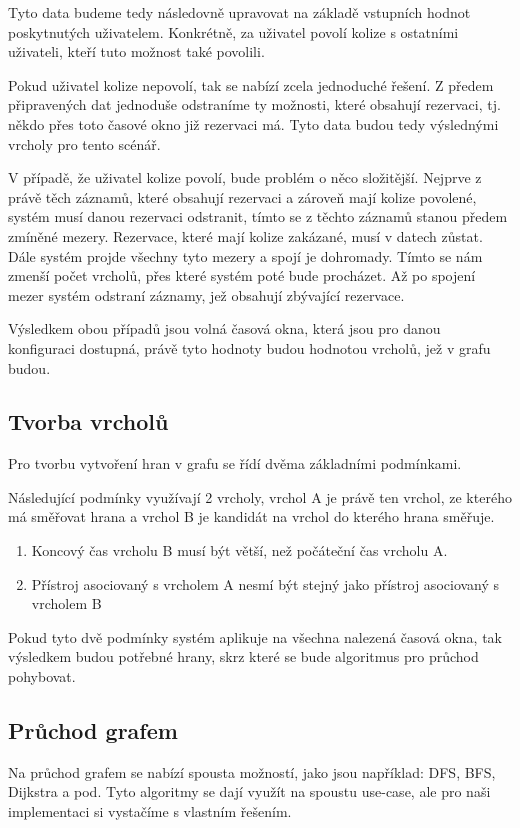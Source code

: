 Tyto data budeme tedy následovně upravovat na základě vstupních hodnot poskytnutých uživatelem. Konkrétně, za uživatel povolí kolize s ostatními uživateli, kteří tuto možnost také povolili.

Pokud uživatel kolize nepovolí, tak se nabízí zcela jednoduché řešení. Z předem připravených dat jednoduše odstraníme ty možnosti, které obsahují rezervaci, tj. někdo přes toto časové okno již rezervaci má. Tyto data budou tedy výslednými vrcholy pro tento scénář.

V případě, že uživatel kolize povolí, bude problém o něco složitější. Nejprve z právě těch záznamů, které obsahují rezervaci a zároveň mají kolize povolené, systém musí danou rezervaci odstranit, tímto se z těchto záznamů stanou předem zmíněné mezery. Rezervace, které mají kolize zakázané, musí v datech zůstat. Dále systém projde všechny tyto mezery a spojí je dohromady.
Tímto se nám zmenší počet vrcholů, přes které systém poté bude procházet. Až po spojení mezer systém odstraní záznamy, jež obsahují zbývající rezervace.

Výsledkem obou případů jsou volná časová okna, která jsou pro danou konfiguraci dostupná, právě tyto hodnoty budou hodnotou vrcholů, jež v grafu budou.

\subsection{Tvorba vrcholů}
Pro tvorbu vytvoření hran v grafu se řídí dvěma základními podmínkami.

Následující podmínky využívají 2 vrcholy, vrchol A je právě ten vrchol, ze kterého má směřovat hrana a vrchol B je kandidát na vrchol do kterého hrana směřuje.
\begin{enumerate}
    \item Koncový čas vrcholu B musí být větší, než počáteční čas vrcholu A.
    \item Přístroj asociovaný s vrcholem A nesmí být stejný jako přístroj asociovaný s vrcholem B
\end{enumerate}

Pokud tyto dvě podmínky systém aplikuje na všechna nalezená časová okna, tak výsledkem budou potřebné hrany, skrz které se bude algoritmus pro průchod pohybovat.


\subsection{Průchod grafem}
Na průchod grafem se nabízí spousta možností, jako jsou například: DFS, BFS, Dijkstra a pod. Tyto algoritmy se dají využít na spoustu use-case, ale pro naši implementaci si vystačíme s vlastním řešením.

